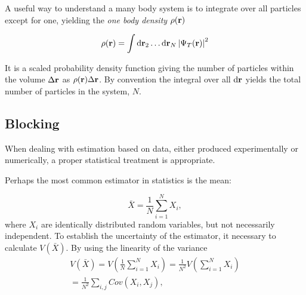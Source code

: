 A useful way to understand a many body system is to integrate over all
particles except for one, yielding the \textit{one body density} \(\rho(\vb{r})\)

\begin{align*}
  \rho( \vb{r} ) = \int \dd \mathbf{r}_{2} \ldots \dd \mathbf{r}_{N} \left| \Psi_T(\vb{r}) \right|^{2}
\end{align*}

It is a scaled probability density function giving the number of particles
within the volume \(\Delta \vb{r}\) as \(\rho(\vb{r})\Delta \vb{r}\).
By convention the integral over all \(\dd \vb{r}\) yields the total number of
particles in the system, \(N\).

\subsection{Blocking}
\label{sec:blocking}
When dealing with estimation based on data, either produced experimentally or numerically, a proper statistical treatment is appropriate. 

Perhaps the most common estimator in statistics is the mean:

\begin{equation}
	\label{eq:mean}
	\bar{X} = \frac{1}{N}\sum_{i=1}^{N}{X_i},
\end{equation}
where $X_i$ are identically distributed random variables, but not necessarily independent. To establish the uncertainty of the estimator, it necessary to calculate $V(\bar{X})$. By using the linearity of the variance
\begin{equation}
\label{eq:estimator var}
\begin{split}
	V(\bar{X}) = V(\frac{1}{N}\sum_{i=1}^{N}{X_i}) = \frac{1}{N^2}V(\sum_{i=1}^{N}{X_i})\\
	=\frac{1}{N^2}\sum_{i,j}{Cov(X_i, X_j)},
\end{split}
\end{equation}

